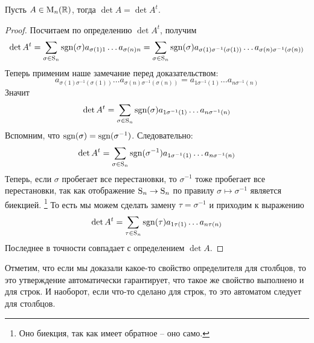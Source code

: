 \begin{claim}
\label{claim::DetTranspose}
Пусть $A\in \operatorname{M}_{n}(\mathbb R)$, тогда $\det A = \det A^t$.
\end{claim}
\begin{proof}
Посчитаем по определению $\det A^t$, получим
\[
\det A^t = \sum_{\sigma\in\operatorname{S}_{n}}\operatorname{sgn}(\sigma)a_{\sigma(1)1} \ldots a_{\sigma(n)n} = 
\sum_{\sigma\in\operatorname{S}_{n}}\operatorname{sgn}(\sigma)a_{\sigma(1)\sigma^{-1}(\sigma(1))} \ldots a_{\sigma(n)\sigma^{-1}(\sigma(n))}
\]
Теперь применим наше замечание перед доказательством:
\[
a_{\sigma(1)\sigma^{-1}(\sigma(1))} \ldots a_{\sigma(n)\sigma^{-1}(\sigma(n))}
=
a_{1 \sigma^{-1}(1)}\ldots a_{n\sigma^{-1}(n)}
\]
Значит
\[
\det A^t = \sum_{\sigma\in\operatorname{S}_{n}}\operatorname{sgn}(\sigma) a_{1 \sigma^{-1}(1)}\ldots a_{n\sigma^{-1}(n)}
\]
Вспомним, что $\operatorname{sgn}(\sigma) = \operatorname{sgn}(\sigma^{-1})$.
Следовательно:
\[
\det A^t = \sum_{\sigma\in\operatorname{S}_{n}}\operatorname{sgn}(\sigma^{-1}) a_{1 \sigma^{-1}(1)}\ldots a_{n\sigma^{-1}(n)}
\]
Теперь, если $\sigma$ пробегает все перестановки, то $\sigma^{-1}$ тоже пробегает все перестановки, так как отображение $\operatorname{S}_{n}\to \operatorname{S}_{n}$ по правилу $\sigma\mapsto \sigma^{-1}$ является биекцией.%
\footnote{Оно биекция, так как имеет обратное -- оно само.}
То есть мы можем сделать замену $\tau = \sigma^{-1}$ и приходим к выражению
\[
\det A^t = \sum_{\tau\in\operatorname{S}_{n}}\operatorname{sgn}(\tau)a_{1\tau(1)}\ldots a_{n\tau(n)}
\]
Последнее в точности совпадает с определением $\det A$.
\end{proof}

Отметим, что если мы доказали какое-то свойство определителя для столбцов, то это утверждение автоматически гарантирует, что такое же свойство выполнено и для строк.
И наоборот, если что-то сделано для строк, то это автоматом следует для столбцов.
